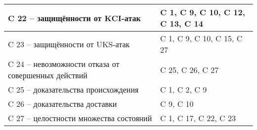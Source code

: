 \begin{center}
\begin{tabular}{ |L{0.7 \textwidth}|L{0.3 \textwidth}| }
		\hline
		C 22 -- защищённости от KCI-атак & C 1, C 9, C 10, C 12, C 13, C 14 \\
		\hline
		C 23 -- защищённости от UKS-атак & C 1, C 9, C 10, C 15, C 27 \\
		\hline
		C 24 -- невозможности отказа от совершенных действий & C 25, C 26, C 27 \\
		\hline
		C 25 -- доказательства происхождения & C 1, C 2, C 9 \\
		\hline
		C 26 -- доказательства доставки & C 9, C 10 \\
		\hline
		C 27 -- целостности множества состояний & C 1, C 17, C 22, C 23 \\
		\hline
	\end{tabular}
\end{center}